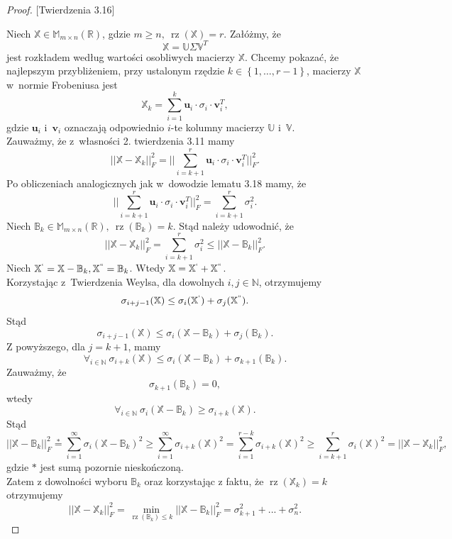 \documentclass[12pt,a4paper]{report}
\newcommand{\set}[1]{\left\lbrace {#1} \right\rbrace}
\newcommand{\setR}{\mathbb{R}}
\newcommand{\setN}{\mathbb{N}}
\newcommand{\rz}[1]{\operatorname{rz}\left({#1} \right)}
\begin{document}
\begin{proof}{[Twierdzenia 3.16]} 

Niech $\mathbb{X} \in \mathbb{M}_{m\times n}(\setR)$, gdzie $m \geqslant n, \: \rz{\mathbb{X}} = r$.
Załóżmy, że
$$
\mathbb{X}=\mathbb{U} \Sigma \mathbb{V}^T
$$
jest rozkładem według wartości osobliwych macierzy $\mathbb{X}$.
Chcemy pokazać, że najlepszym przybliżeniem, przy ustalonym rzędzie $k \in \set{1, \ldots, r-1}$, macierzy $\mathbb{X}$ w~normie Frobeniusa jest
$$
\mathbb{X}_k = \sum_{i=1}^k \mathbf{u}_i\cdot \sigma_i \cdot \mathbf{v}_i^T,
$$
gdzie $\mathbf{u}_i$ i~$\mathbf{v}_i$ oznaczają odpowiednio $i$-te kolumny macierzy $\mathbb{U}$ i~$\mathbb{V}$.
\\Zauważmy, że z~własności 2. twierdzenia 3.11 mamy
$$
||\mathbb{X} - \mathbb{X}_k||_F^2 = ||\sum_{i=k+1}^r \mathbf{u}_i \cdot \sigma_i \cdot \mathbf{v}_i^T||_F^2.
$$
Po obliczeniach analogicznych jak w~dowodzie lematu 3.18 mamy, że
$$
||\sum_{i=k+1}^r \mathbf{u}_i \cdot \sigma_i \cdot \mathbf{v}_i^T||_F^2 =\sum_{i=k+1}^r \sigma_i^2.
$$
Niech $\mathbb{B}_k \in \mathbb{M}_{m \times n}(\setR), \: \rz{\mathbb{B}_k} = k$. 
Stąd należy udowodnić, że
$$
||\mathbb{X} - \mathbb{X}_k||_F^2 = \sum_{i=k+1}^r \sigma_i^2 \leqslant ||\mathbb{X} - \mathbb{B}_k||_F^2.
$$
Niech $\mathbb{X}^{`} = \mathbb{X}-\mathbb{B}_k, \mathbb{X}^{``} = \mathbb{B}_k$.
Wtedy $\mathbb{X} = \mathbb{X}^{`} + \mathbb{X}^{``}$. 
\\Korzystając z~Twierdzenia Weylsa, dla dowolnych $i,j \in \setN$, otrzymujemy
$$
\sigma_{i+j-1}(\mathbb{X})\leq \sigma_{i}(\mathbb{X}^{`}) + \sigma_j(\mathbb{X}^{``}).
$$ 
Stąd
$$
\sigma_{i+j-1}(\mathbb{X})\leq \sigma_{i}(\mathbb{X} - \mathbb{B}_k) + \sigma_j(\mathbb{B}_k).
$$ 
Z powyższego, dla $j= k+1$, mamy
$$
\forall_{i \in \setN} \: \sigma_{i+k}(\mathbb{X})\leq \sigma_{i}(\mathbb{X} - \mathbb{B}_k) + \sigma_{k+1}(\mathbb{B}_k).
$$ 
Zauważmy, że
$$
\sigma_{k+1}(\mathbb{B}_k)=0,
$$
wtedy
$$
\forall_{i \in \setN} \: \sigma_i(\mathbb{X}-\mathbb{B}_k)\geq \sigma_{i+k}(\mathbb{X}).
$$
Stąd
$$
||\mathbb{X} - \mathbb{B}_k||_F^2 \stackrel{*}{=} \sum_{i=1}^{\infty} \sigma_i(\mathbb{X}-\mathbb{B}_k)^2 \geq \sum_{i=1}^{\infty} \sigma_{i+k}(\mathbb{X})^2 = \sum_{i=1}^{r-k} \sigma_{i+k}(\mathbb{X})^2 \geq \sum_{i = k+1}^r \sigma_i(\mathbb{X})^2 = ||\mathbb{X}-\mathbb{X}_k||_F^2,
$$
gdzie $*$ jest sumą pozornie nieskończoną.
\\Zatem z dowolności wyboru $\mathbb{B}_k$ oraz korzystając z faktu, że $\rz{\mathbb{X}_k} = k$ otrzymujemy
$$
||\mathbb{X} - \mathbb{X}_k||_F^2 = \min \limits_{\rz{\mathbb{B}_k} \leqslant k } ||\mathbb{X} - \mathbb{B}_k||_F^2 = \sigma_{k+1}^2 + ... + \sigma_{n}^2.
$$
\end{proof}
\end{document}
